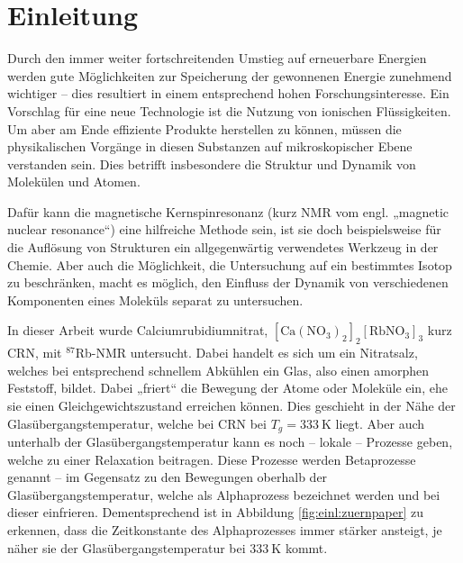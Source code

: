 \chapter{Einleitung}


Durch den immer weiter fortschreitenden Umstieg auf erneuerbare Energien werden gute Möglichkeiten zur Speicherung der gewonnenen Energie zunehmend wichtiger -- dies resultiert in einem entsprechend hohen Forschungsinteresse. Ein Vorschlag für eine neue Technologie ist die Nutzung von ionischen Flüssigkeiten. Um aber am Ende effiziente Produkte herstellen zu können, müssen die physikalischen Vorgänge in diesen Substanzen auf mikroskopischer Ebene verstanden sein. Dies betrifft insbesondere die Struktur und Dynamik von Molekülen und Atomen. 

Dafür kann die magnetische Kernspinresonanz (kurz NMR vom engl. „magnetic nuclear resonance“) eine hilfreiche Methode sein, ist sie doch beispielsweise für die Auflösung von Strukturen ein allgegenwärtig verwendetes Werkzeug in der Chemie. Aber auch die Möglichkeit, die Untersuchung auf ein bestimmtes Isotop zu beschränken, macht es möglich, den Einfluss der Dynamik von verschiedenen Komponenten eines Moleküls separat zu untersuchen.

In dieser Arbeit wurde Calciumrubidiumnitrat, $[\text{Ca}(\text{NO}_\text{3})_\text{2}]_\text{2}[\text{RbNO}_\text{3}]_\text{3}$ kurz CRN, mit $^\text{87}$Rb-NMR untersucht. Dabei handelt es sich um ein Nitratsalz, welches bei entsprechend schnellem Abkühlen ein Glas, also einen amorphen Feststoff, bildet. Dabei „friert“ die Bewegung der Atome oder Moleküle ein, ehe sie einen Gleichgewichtszustand erreichen können. Dies geschieht in der Nähe der Glasübergangstemperatur, welche bei CRN bei $T_g = \SI{333}{\kelvin}$ liegt. Aber auch unterhalb der Glasübergangstemperatur kann es noch -- lokale -- Prozesse geben, welche zu einer Relaxation beitragen. Diese Prozesse werden Betaprozesse genannt -- im Gegensatz zu den Bewegungen oberhalb der Glasübergangstemperatur, welche als Alphaprozess bezeichnet werden und bei dieser einfrieren. Dementsprechend ist in Abbildung \ref{fig:einl:zuernpaper} zu erkennen, dass die Zeitkonstante des Alphaprozesses immer stärker ansteigt, je näher sie der Glasübergangstemperatur bei $\SI{333}{\kelvin}$ kommt.

